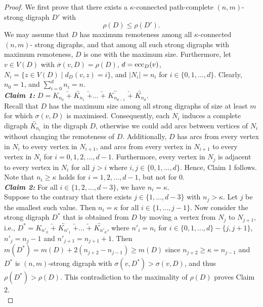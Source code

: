 \documentclass[a4paper,11pt]{article}
\begin{document}
	\begin{proof}
We first prove that there exists a $\kappa$-connected path-complete $(n,m)$- strong digraph $D'$ with 
\begin{equation} \label{eq:exists-pc-kappa-digraph}
\rho(D) \leq \rho(D'). 
\end{equation}
We may assume that $D$ has maximum remoteness among all $\kappa$-connected $(n,m)$- strong digraphs, and that among all such strong digraphs with maximum remoteness, $D$ is one with the maximum size. Furthermore, let $v \in V(D)$ with $\overline{\sigma}(v,D) = \rho(D)$, $d = {\rm ecc}_D(v)$, $N_{i} = \{z \in V(D) \mid d_{D}(v,z) = i \}$, and $|N_{i}| = n_i$ for $i \in \{0, 1, \ldots, d\}$. Clearly, $n_0 = 1$,  and $\sum_{i=0}^{d} n_i = n$. \\

\emph{{\bf Claim 1:}} $D=K_{n_0} \; \overleftarrow{+} \; \overleftrightarrow{K_{n_1}} \; \overleftarrow{+} \ldots \; \overleftarrow{+} \;  \overleftrightarrow{K_{n_{d-1}}} \; \overleftarrow{+} \; \overleftrightarrow{K_{n_{d}}}$. \\
 
Recall that \( D \) has the maximum size among all strong digraphs of size at least \( m \) for which \( \sigma(v, D) \) is maximised. Consequently, each \( N_i \) induces a complete digraph \( \overleftrightarrow{K_{n_i}} \) in the digraph \( D \), otherwise we could add arcs between vertices of $N_i$ without changing the remoteness of $D$. Additionally, \( D \) has arcs from every vertex in \( N_i \) to every vertex in \( N_{i+1} \), and arcs from every vertex in \( N_{i+1} \) to every vertex in \( N_i \) for \( i = 0, 1, 2, \ldots, d-1 \). Furthermore, every vertex in \( N_j \) is adjacent to every vertex in \( N_i \) for all \( j > i \) where \( i, j \in \{0, 1, \ldots, d\} \). Hence, Claim 1 follows. \\

Note that $n_i \geq \kappa$ holds for $i=1,2,\ldots,d-1$, but not for $0$.\\

\emph{{\bf Claim 2:}} For all $ i \in \{1,2, \ldots, d-3\} $, we have $ n_i = \kappa $. \\

Suppose to the contrary that there exists $ j \in \{1,\ldots,d-3\} $ with $ n_{j}>\kappa $. Let $j$ be the smallest such value. Then $n_{i} = \kappa$ for all $ i \in \{1,\ldots,j-1\} $. Now consider the strong digraph $D^*$ that is obtained from $D$ by moving a vertex from $N_j$ to $N_{j+1}$, i.e., $D^*=K_{n'_0} \; \overleftarrow{+} \; \overleftrightarrow{K_{n'_1}} \; \overleftarrow{+} \ldots \; \overleftarrow{+} \; \overleftrightarrow{K_{n'_d}}$, where
$n'_i=n_i$ for $i \in \{0,1,\ldots,d\} - \{j,j+1\}$,  
$n'_j=n_j-1$ and $n'_{j+1}= n_{j+1}+1$. Then $m(D^*) = m(D) + 2(n_{j+2} - n_{j-1}) \geq m(D)$ since $n_{j+2} \geq \kappa=n_{j-1}$ and $D^{*}$ is $(n,m)$-strong digraph with $\sigma(v,D^{*}) > \sigma (v,D)$, and thus $\rho(D^{*}) > \rho(D)$. This contradiction to the maximality of $\rho(D)$ proves Claim 2.  \\


\end{proof}
\end{document}
